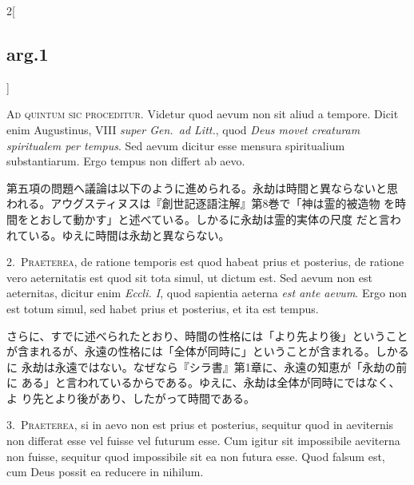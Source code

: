 \documentclass[paper=a4paper,fontsize=10pt,jafontsize=9pt,titlepage]{jlreq}
\begin{document}
\begin{paracol}{2}[\subsection{arg.1}]

{\huge A}{\scshape d quintum sic proceditur}. Videtur quod aevum non sit
 aliud a tempore. Dicit enim Augustinus, VIII {\itshape super Gen.~ad Litt.},
 quod {\itshape Deus movet creaturam spiritualem per tempus}. Sed aevum dicitur
 esse mensura spiritualium substantiarum. Ergo tempus non differt ab
 aevo.

\switchcolumn

第五項の問題へ議論は以下のように進められる。永劫は時間と異ならないと思
われる。アウグスティヌスは『創世記逐語注解』第8巻で「神は霊的被造物
を時間をとおして動かす」と述べている。しかるに永劫は霊的実体の尺度
だと言われている。ゆえに時間は永劫と異ならない。


2.~{\scshape Praeterea}, de ratione temporis est quod habeat prius et
 posterius, de ratione vero aeternitatis est quod sit tota simul, ut
 dictum est. Sed aevum non est aeternitas, dicitur enim {\itshape Eccli. I},
 quod sapientia aeterna {\itshape est ante aevum}. Ergo non est totum simul, sed
 habet prius et posterius, et ita est tempus.

\switchcolumn

さらに、すでに述べられたとおり、時間の性格には「より先より後」ということ
が含まれるが、永遠の性格には「全体が同時に」ということが含まれる。しかるに
永劫は永遠ではない。なぜなら『シラ書』第1章に、永遠の知恵が「永劫の前に
ある」と言われているからである。ゆえに、永劫は全体が同時にではなく、よ
り先とより後があり、したがって時間である。


3.~{\scshape Praeterea}, si in aevo non est prius et posterius,
sequitur quod in aeviternis non differat esse vel fuisse vel futurum
esse. Cum igitur sit impossibile aeviterna non fuisse, sequitur quod
impossibile sit ea non futura esse. Quod falsum est, cum Deus possit
ea reducere in nihilum.


\end{paracol}
\end{document}
